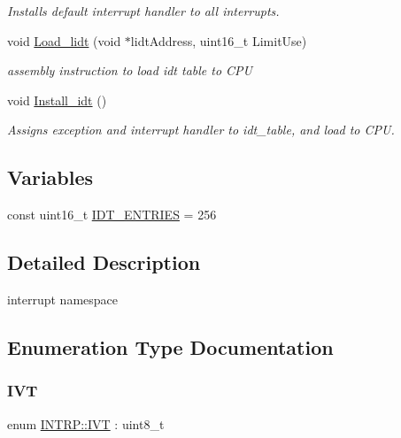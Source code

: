 \begin{DoxyCompactItemize}
\begin{DoxyCompactList}\small\item\em Installs default interrupt handler to all interrupts. \end{DoxyCompactList}\item 
void \hyperlink{namespace_i_n_t_r_p_a194f85d6c873615e9125466e3b23c30f}{Load\+\_\+lidt} (void $\ast$lidt\+Address, uint16\+\_\+t Limit\+Use)
\begin{DoxyCompactList}\small\item\em assembly instruction to load idt table to C\+PU \end{DoxyCompactList}\item 
void \hyperlink{namespace_i_n_t_r_p_a139b273cc1e45d3c2fdfe0d387a98518}{Install\+\_\+idt} ()
\begin{DoxyCompactList}\small\item\em Assigns exception and interrupt handler to idt\+\_\+table, and load to C\+PU. \end{DoxyCompactList}\end{DoxyCompactItemize}
\subsection*{Variables}
\begin{DoxyCompactItemize}
\item 
const uint16\+\_\+t \hyperlink{namespace_i_n_t_r_p_a1022b4dc1d9af1ea393f7f038ff421ce}{I\+D\+T\+\_\+\+E\+N\+T\+R\+I\+ES} = 256
\end{DoxyCompactItemize}


\subsection{Detailed Description}
interrupt namespace 

\subsection{Enumeration Type Documentation}
\mbox{\label{namespace_i_n_t_r_p_a790699fb2953ef4ab70c7dc7148a1c94}} 
\subsubsection{\texorpdfstring{I\+VT}{IVT}}
{\footnotesize\ttfamily enum \hyperlink{namespace_i_n_t_r_p_a790699fb2953ef4ab70c7dc7148a1c94}{I\+N\+T\+R\+P\+::\+I\+VT} \+: uint8\+\_\+t}

